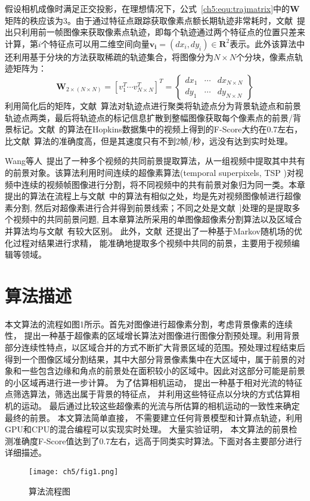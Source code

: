 假设相机成像时满足正交投影，在理想情况下，公式~\ref{ch5:equ:trajmatrix}中的$\mathbf{W}$矩阵的秩应该为3\cite{Tomasi_1992}。由于通过特征点跟踪获取像素点额长期轨迹非常耗时，文献~\cite{ACPRRealTime}提出只利用前一帧图像来获取像素点轨迹，即每个轨迹通过两个特征点的位置只差来计算，第$i$个特征点可以用二维空间向量$\mathbf{v_i}=(dx_i,dy_i) \in \mathbf{R}^2$表示。此外该算法中还利用基于分块的方法获取稀疏的轨迹集合，将图像分为$N \times N$个分块，像素点轨迹矩阵为：
$$ \mathbf{W}_{2 \times (N \times N )} = {[v_{1}^T \cdots v_{N \times N}^T]}^T = \begin{Bmatrix}
dx_1 & \cdots & dx_{N \times N} \\
dy_1 & \cdots & dy_{N \times N}
\end{Bmatrix}$$
利用简化后的矩阵，文献~\cite{ACPRRealTime}算法对轨迹点进行聚类将轨迹点分为背景轨迹点和前景轨迹点两类，最后将轨迹点的标记信息扩散到整幅图像获取每个像素点的前景/背景标记。文献~\cite{ACPRRealTime}的算法在Hopkins数据集中的视频上\cite{HopKinsDataSet}得到的F-Score大约在0.7左右，比文献~\cite{5.8s}算法的准确度高，但是其速度只有不到2帧/秒，远没有达到实时处理。\par

Wang等人~\cite{WangTMM2014}提出了一种多个视频的共同前景提取算法，从一组视频中提取其中共有的前景对象。该算法利用时间连续的超像素算法(temporal superpixels, TSP )对视频中连续的视频帧图像进行分割，将不同视频中的共有前景对象归为同一类。本章提出的算法在流程上与文献~中的算法有相似之处，均是先对视频图像帧进行超像素分割, 然后对超像素进行合并得到前景线索；不同之处是文献~]处理的是提取多个视频中的共同前景问题, 且本章算法所采用的单图像超像素分割算法以及区域合并算法均与文献~有较大区别。 此外，文献~还提出了一种基于Markov随机场的优化过程对结果进行求精， 能准确地提取多个视频中共同的前景，主要用于视频编辑等领域。




\section{算法描述}
\label{ch5:sec:algorithm}
本文算法的流程如图1所示。首先对图像进行超像素分割，考虑背景像素的连续性， 提出一种基于超像素的区域增长算法对图像进行图像分割预处理。利用背景部分连续性特点，以区域合并的方式不断扩大背景区域的范围。预处理过程结束后得到一个图像区域分割结果，其中大部分背景像素集中在大区域中，属于前景的对象和一些包含边缘和角点的前景处在面积较小的区域中。因此对这部分可能是前景的小区域再进行进一步计算。 为了估算相机运动， 提出一种基于相对光流的特征点筛选算法，筛选出属于背景的特征点， 并利用这些特征点以分块的方式估算相机的运动。 最后通过比较这些超像素的光流与所估算的相机运动的一致性来确定最终的前景。 本文算法简单直接， 不需要建立任何背景模型和计算点轨迹，利用GPU和CPU的混合编程可以实现实时处理。 大量实验证明， 本文算法的前景检测准确度F-Score值达到了0.7左右，远高于同类实时算法\cite{5.8s}。下面对各主要部分进行详细描述。
\begin{figure}
  \centering
  \texttt{[image: ch5/fig1.png]}\\
  \caption{算法流程图}\label{ch5:fig:flowchart}
\end{figure}

